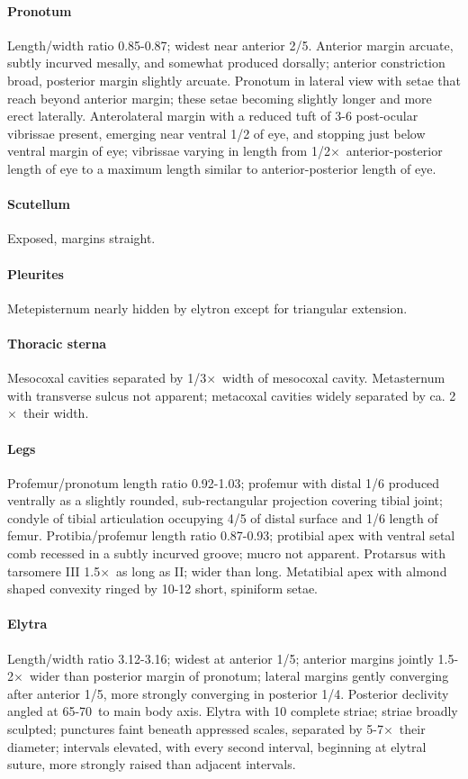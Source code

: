 \documentclass[fleqn,10pt,lineno]{wlpeerj} %
\newcommand{\td}{\textdegree~}
\newcommand{\x}{$\times$~}
\begin{document}
			\paragraph{Pronotum}
				Length/width ratio 0.85-0.87; widest near anterior 2/5.
				Anterior margin arcuate, subtly incurved mesally, and somewhat produced dorsally; anterior constriction broad, posterior margin slightly arcuate.
				Pronotum in lateral view with setae that reach beyond anterior margin; these setae becoming slightly longer and more erect laterally.
				Anterolateral margin with a reduced tuft of 3-6 post-ocular vibrissae present, emerging near ventral 1/2 of eye, and stopping just below ventral margin of eye; vibrissae varying in length from 1/2\x anterior-posterior length of eye to a maximum length similar to anterior-posterior length of eye.
			\paragraph{Scutellum}
				Exposed, margins straight.
			\paragraph{Pleurites}
				Metepisternum nearly hidden by elytron except for triangular extension.
			\paragraph{Thoracic sterna} 
				Mesocoxal cavities separated by 1/3\x width of mesocoxal cavity. 
				Metasternum with transverse sulcus not apparent; metacoxal cavities widely separated by ca. 2\x their width.
			\paragraph{Legs}
				Profemur/pronotum length ratio 0.92-1.03; profemur with distal 1/6 produced ventrally as a slightly rounded, sub-rectangular projection covering tibial joint; condyle of tibial articulation occupying 4/5 of distal surface and 1/6 length of femur. 
				Protibia/profemur length ratio 0.87-0.93; protibial apex with ventral setal comb recessed in a subtly incurved groove; mucro not apparent. 
				Protarsus with tarsomere III 1.5\x as long as II; wider than long. 
				Metatibial apex with almond shaped convexity ringed by 10-12 short, spiniform setae.
			\paragraph{Elytra}
				Length/width ratio 3.12-3.16; widest at anterior 1/5; anterior margins jointly 1.5-2\x wider than posterior margin of pronotum; lateral margins gently converging after anterior 1/5, more strongly converging in posterior 1/4. 
				Posterior declivity angled at 65-70\td to main body axis. Elytra with 10 complete striae; striae broadly sculpted; punctures faint beneath appressed scales, separated by 5-7\x their diameter; intervals elevated, with every second interval, beginning at elytral suture, more strongly raised than adjacent intervals.
\end{document}
